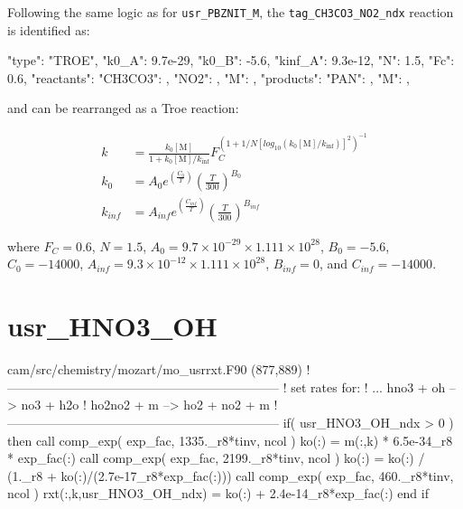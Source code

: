 \documentclass[titlepage]{article}
\begin{document}
Following the same logic as for \verb>usr_PBZNIT_M>, the \verb>tag_CH3CO3_NO2_ndx> reaction is identified as:

\begin{blockcode}
         {
          "type": "TROE",
          "k0_A": 9.7e-29,
          "k0_B": -5.6,
          "kinf_A": 9.3e-12,
          "N": 1.5,
          "Fc": 0.6,
          "reactants": {
            "CH3CO3": { },
            "NO2": { },
            "M": { }
          },
          "products": {
            "PAN": { },
            "M": { }
          }
        },
\end{blockcode}

\noindent and can be rearranged as a Troe reaction:

\begin{equation}
\begin{split}
k & = \frac{k_0[\mbox{M}]}{1+k_0[\mbox{M}]/k_{\inf}}F_C^{(1+1/N[log_{10}(k_0[\mbox{M}]/k_{\inf})]^2)^{-1}} \\
k_0 & = A_0 e^{\left( \frac{C_0}{T} \right)} \left( \frac{T}{300} \right)^{B_0} \\
k_{inf} & = A_{inf} e^{\left( \frac{C_{inf}}{T} \right)} \left( \frac{T}{300} \right)^{B_{inf}}
\end{split}
\end{equation}

\noindent where $F_C = 0.6$, $N = 1.5$, $A_0 = 9.7 \times 10^{-29} \times 1.111 \times 10^{28}$, $B_0 = -5.6$, $C_0 = -14000$, $A_{inf} = 9.3 \times 10^{-12} \times 1.111 \times 10^{28}$, $B_{inf} = 0$, and $C_{inf} = -14000$.


\section{usr\_HNO3\_OH}

\begin{blockcode}[commandchars=\\\{\}]
\color{gray}cam/src/chemistry/mozart/mo_usrrxt.F90 (877,889)
!-----------------------------------------------------------------
! set rates for:
!   ... hno3 + oh --> no3 + h2o
!           ho2no2 + m --> ho2 + no2 + m
!-----------------------------------------------------------------
       if( usr_HNO3_OH_ndx > 0 ) then
          call comp_exp( exp_fac, 1335._r8*tinv, ncol )
          ko(:) = m(:,k) * 6.5e-34_r8 * exp_fac(:)
          call comp_exp( exp_fac, 2199._r8*tinv, ncol )
          ko(:) = ko(:) / (1._r8 + ko(:)/(2.7e-17_r8*exp_fac(:)))
          call comp_exp( exp_fac, 460._r8*tinv, ncol )
          rxt(:,k,usr_HNO3_OH_ndx) = ko(:) + 2.4e-14_r8*exp_fac(:)
       end if
\end{blockcode}
\end{document}
